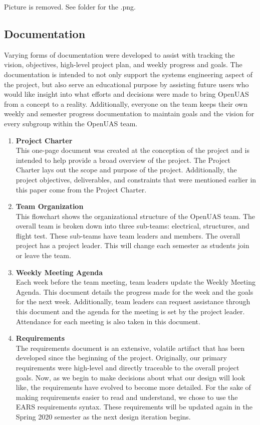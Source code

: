 \documentclass{article}
\begin{document}
Picture is removed. See folder for the .png. 
\newpage

\subsection{Documentation}

Varying forms of documentation were developed to assist with tracking the vision, objectives, high-level project plan, and weekly progress and goals. The documentation is intended to not only support the systems engineering aspect of the project, but also serve an educational purpose by assisting future users who would like insight into what efforts and decisions were made to bring OpenUAS from a concept to a reality. Additionally, everyone on the team keeps their own weekly and semester progress documentation to maintain goals and the vision for every subgroup within the OpenUAS team. 

\begin{enumerate}
\item \textbf{Project Charter}\\ This one-page document was created at the conception of the project and is intended to help provide a broad overview of the project. The Project Charter lays out the scope and purpose of the project. Additionally, the project objectives, deliverables, and constraints that were mentioned earlier in this paper come from the Project Charter. 
\item \textbf{Team Organization}\\ This flowchart shows the organizational structure of the OpenUAS team. The overall team is broken down into three sub-teams: electrical, structures, and flight test. These sub-teams have team leaders and members. The overall project has a project leader. This will change each semester as students join or leave the team. 
\item \textbf{Weekly Meeting Agenda}\\Each week before the team meeting, team leaders update the Weekly Meeting Agenda. This document details the progress made for the week and the goals for the next week. Additionally, team leaders can request assistance through this document and the agenda for the meeting is set by the project leader. Attendance for each meeting is also taken in this document. 
\item \textbf{Requirements}\\ The requirements document is an extensive, volatile artifact that has been developed since the beginning of the project. Originally, our primary requirements were high-level and directly traceable to the overall project goals. Now, as we begin to make decisions about what our design will look like, the requirements have evolved to become more detailed. For the sake of making requirements easier to read and understand, we chose to use the EARS \cite{Terzakis2013} requirements syntax. These requirements will be updated again in the Spring 2020 semester as the next design iteration begins. 
\end{enumerate}
\end{document}
